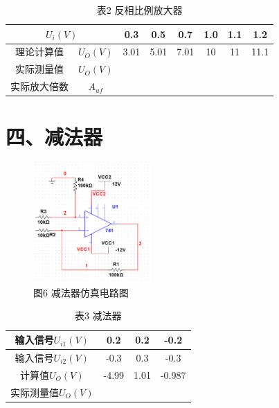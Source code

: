 \documentclass[a4paper,10pt,notitlepage]{article}
\begin{document}
	\begin{table}[h]
		\centering
		\begin{tabular}{|c|c|c|c|c|c|c|c|}
			\hline
			\multicolumn{2}{|c|}{$U_i(V)$} & 0.3 & 0.5 & 0.7 & 1.0 & 1.1 & 1.2 \\
			\hline
			理论计算值 & $U_O(V)$ & 3.01 & 5.01 & 7.01 & 10 & 11 & 11.1 \\
			\hline
			实际测量值 & $U_O(V)$ & \qquad & \qquad & \qquad & \qquad & \qquad & \qquad \\
			\hline
			实际放大倍数 & $A_{uf}$ & \qquad & \qquad & \qquad & \qquad & \qquad & \qquad \\
			\hline
		\end{tabular}
		\caption*{表2 反相比例放大器}
	\end{table}
	\newpage
	\section*{四、减法器}
	\begin{figure}[h]
		\centering
		\includegraphics[width=0.4\textwidth]{7.png}
		\caption*{图6 减法器仿真电路图}
	\end{figure}
	\begin{table}[h]
	\centering
	\begin{tabular}{|c|c|c|c|}
		\hline
		输入信号$U_{i1}(V)$ & 0.2 & 0.2 & -0.2 \\
		\hline
		输入信号$U_{i2}(V)$ & -0.3 & 0.3 & -0.3 \\
		\hline
		计算值$U_O(V)$ & -4.99 & 1.01 & -0.987 \\
		\hline
		实际测量值$U_O(V)$ & \qquad & \qquad & \qquad \\
		\hline
	\end{tabular}
	\caption*{表3 减法器}
	\end{table}
\end{document}
